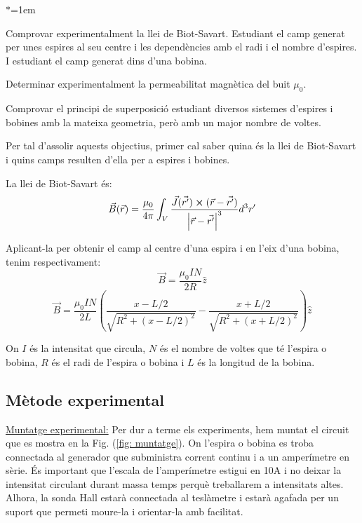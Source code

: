 \documentclass[11pt]{article}
\numberwithin{equation}{section}
\numberwithin{figure}{section}
\numberwithin{table}{section}
\begin{document}
\begin{list}{$\ast$}{\leftmargin=1em}
    \item Comprovar experimentalment la llei de Biot-Savart. Estudiant el camp generat per unes espires al seu centre i les dependències amb el radi i el nombre d'espires. I estudiant el camp generat dins d'una bobina.
    \item Determinar experimentalment la permeabilitat magnètica del buit $\mu_0$.
    \item Comprovar el principi de superposició estudiant diversos sistemes d'espires i bobines amb la mateixa geometria, però amb un major nombre de voltes.
\end{list}

Per tal d'assolir aquests objectius, primer cal saber quina és la llei de Biot-Savart i quins camps resulten d'ella per a espires i bobines.

La llei de Biot-Savart és:
\begin{equation} \label{eq: Biot-Savart}
    \vec{B}(\vec{r}) = \frac{\mu_0}{4\pi}\int_V\frac{\vec{J}(\vec{r'}) \cross (\vec{r}-\vec{r'})}{\abs{\vec{r}-\vec{r'}}^3}d^3r'
\end{equation}

Aplicant-la per obtenir el camp al centre d'una espira i en l'eix d'una bobina, tenim respectivament:
\begin{equation} \label{eq: B_espira}
    \vec{B} = \frac{\mu_0IN}{2R}\hat{z}
\end{equation}
\begin{equation} \label{eq: B_bobina}
    \vec{B} = \frac{\mu_0IN}{2L}\left(\frac{x-L/2}{\sqrt{R^2+(x-L/2)^2}}-\frac{x+L/2}{\sqrt{R^2+(x+L/2)^2}}  \right) \hat{z}
\end{equation}

On $I$ és la intensitat que circula, $N$ és el nombre de voltes que té l'espira o bobina, $R$ és el radi de l'espira o bobina i $L$ és la longitud de la bobina.

\subsection{Mètode experimental}\label{sec: mètode}

\underline{Muntatge experimental:}
Per dur a terme els experiments, hem muntat el circuit que es mostra en la Fig. (\ref{fig: muntatge}). On l'espira o bobina es troba connectada al generador que subministra corrent continu i a un amperímetre en sèrie. És important que l'escala de l'amperímetre estigui en 10A i no deixar la intensitat circulant durant massa temps perquè treballarem a intensitats altes. Alhora, la sonda Hall estarà connectada al teslàmetre i estarà agafada per un suport que permeti moure-la i orientar-la amb facilitat.
\end{document}
